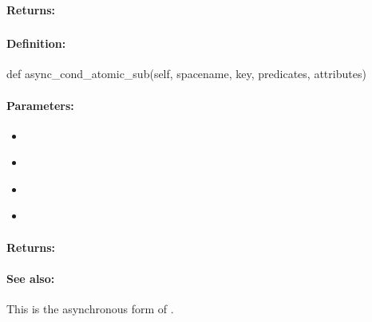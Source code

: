 \paragraph{Returns:}


\pagebreak
\subsubsection{}
\label{api:python:async_cond_atomic_sub}


\paragraph{Definition:}
\begin{pythoncode}
def async_cond_atomic_sub(self, spacename, key, predicates, attributes)
\end{pythoncode}

\paragraph{Parameters:}
\begin{itemize}[noitemsep]
\item {}\\

\item {}\\

\item {}\\

\item {}\\

\end{itemize}

\paragraph{Returns:}


\paragraph{See also:}  This is the asynchronous form of .

